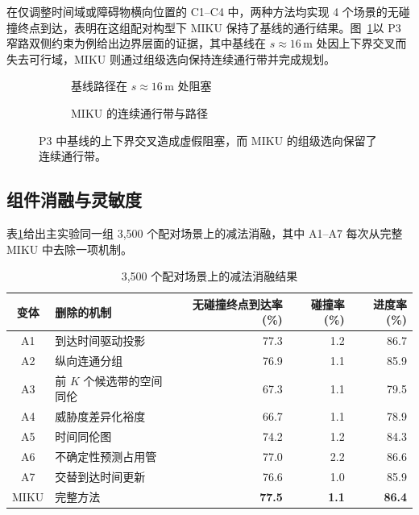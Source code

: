 \documentclass[a4paper,zihao=5]{ctexart}
\theoremstyle{definition}
\begin{document}
在仅调整时间域或障碍物横向位置的 C1--C4 中，两种方法均实现 4 个场景的无碰撞终点到达，表明在这组配对构型下 MIKU 保持了基线的通行结果。图~\ref{fig:q34_narrow_sl}以 P3 窄路双侧约束为例给出边界层面的证据，其中基线在 $s\approx16$\,m 处因上下界交叉而失去可行域，MIKU 则通过组级选向保持连续通行带并完成规划。

\begin{figure}[htbp]
\centering
\begin{subfigure}[b]{0.48\textwidth}
  \centering
  \caption{基线路径在 $s\approx16$\,m 处阻塞}
\end{subfigure}\hfill
\begin{subfigure}[b]{0.48\textwidth}
  \centering
  \caption{MIKU 的连续通行带与路径}
\end{subfigure}
\caption{窄路多障碍物场景的 SL 路径边界与通行对比}
\caption*{P3 中基线的上下界交叉造成虚假阻塞，而 MIKU 的组级选向保留了连续通行带。}
\label{fig:q34_narrow_sl}
\end{figure}

\subsection{组件消融与灵敏度}
\label{subsec:exp_ablation}

表\ref{tab:exp_ablation_score}给出主实验同一组 3,500 个配对场景上的减法消融，其中 A1--A7 每次从完整 MIKU 中去除一项机制。

\begin{table}[htbp]
\centering
\caption{3,500 个配对场景上的减法消融结果}
\label{tab:exp_ablation_score}
\small
\begin{tabular}{clrrr}
\toprule
\textbf{变体} & \textbf{删除的机制} & \textbf{无碰撞终点到达率(\%)} & \textbf{碰撞率(\%)} & \textbf{进度率(\%)} \\
\midrule
A1 & 到达时间驱动投影 & 77.3 & 1.2 & 86.7 \\
A2 & 纵向连通分组 & 76.9 & 1.1 & 85.9 \\
A3 & 前 $K$ 个候选带的空间同伦 & 67.3 & 1.1 & 79.5 \\
A4 & 威胁度差异化裕度 & 66.7 & 1.1 & 78.9 \\
A5 & 时间同伦图 & 74.2 & 1.2 & 84.3 \\
A6 & 不确定性预测占用管 & 77.0 & 2.2 & 86.6 \\
A7 & 交替到达时间更新 & 76.6 & 1.0 & 85.9 \\
MIKU & 完整方法 & \textbf{77.5} & \textbf{1.1} & \textbf{86.4} \\
\bottomrule
\end{tabular}
\end{table}
\end{document}

